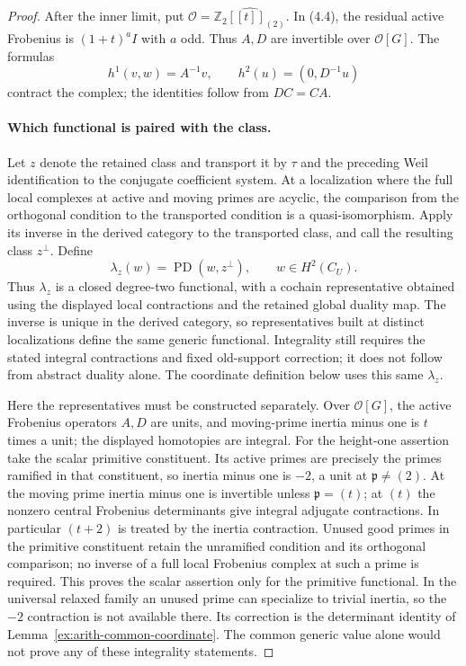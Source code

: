 \documentclass[11pt]{article}
\theoremstyle{definition}
\theoremstyle{remark}
\newcommand{\Z}{\mathbb Z}
\providecommand{\mathscr}[1]{\mathcal{#1}}
\begin{document}
\begin{proof}\leavevmode
After the inner limit, put
$\mathscr O=\widehat{\Z_2[[t]]_{(2)}}$.
In (4.4), the residual active Frobenius is $(1+t)^aI$ with $a$ odd.
Thus $A,D$ are invertible over $\mathscr O[G]$.
The formulas
\[
 h^1(v,w)=A^{-1}v,\qquad h^2(u)=(0,D^{-1}u)
\]
contract the complex; the identities follow from $DC=CA$.
\paragraph{Which functional is paired with the class.}
Let $z$ denote the retained class and transport it by $\tau$ and the
preceding Weil identification to the conjugate coefficient system.
At a localization where the full local complexes at active and
moving primes are acyclic, the comparison from the orthogonal
condition to the transported condition is a quasi-isomorphism.
Apply its inverse in the derived category to the transported class,
and call the resulting class $z^\perp$. Define
\[
 \lambda_z(w)=\operatorname{PD}(w,z^\perp),\qquad
           w\in H^2(C_U).
\]
Thus $\lambda_z$ is a closed degree-two functional, with a cochain
representative obtained using the displayed local contractions and
the retained global duality map. The inverse is unique in the derived
category, so representatives built at distinct localizations define
the same generic functional. Integrality still requires the stated
integral contractions and fixed old-support correction; it does not
follow from abstract duality alone. The coordinate definition below uses this same $\lambda_z$.

Here the representatives must be constructed separately. Over
$\mathscr O[G]$, the active Frobenius operators $A,D$ are units,
and moving-prime inertia minus one is $t$ times a unit; the displayed
homotopies are integral. For the height-one assertion take the scalar
primitive constituent. Its active primes are precisely the primes
ramified in that constituent, so inertia minus one is $-2$, a unit
at $\mathfrak p\ne(2)$. At the moving prime inertia minus one is
invertible unless $\mathfrak p=(t)$; at $(t)$ the nonzero central
Frobenius determinants give integral adjugate contractions. In
particular $(t+2)$ is treated by the inertia contraction. Unused
good primes in the primitive constituent retain the unramified
condition and its orthogonal comparison; no inverse of a full local
Frobenius complex at such a prime is required. This proves the
scalar assertion only for the primitive functional. In the universal
relaxed family an unused prime can specialize to trivial inertia,
so the $-2$ contraction is not available there. Its correction is
the determinant identity of Lemma~\ref{ex:arith-common-coordinate}.
The common generic value alone would not prove any of these
integrality statements.


\end{proof}
\end{document}
